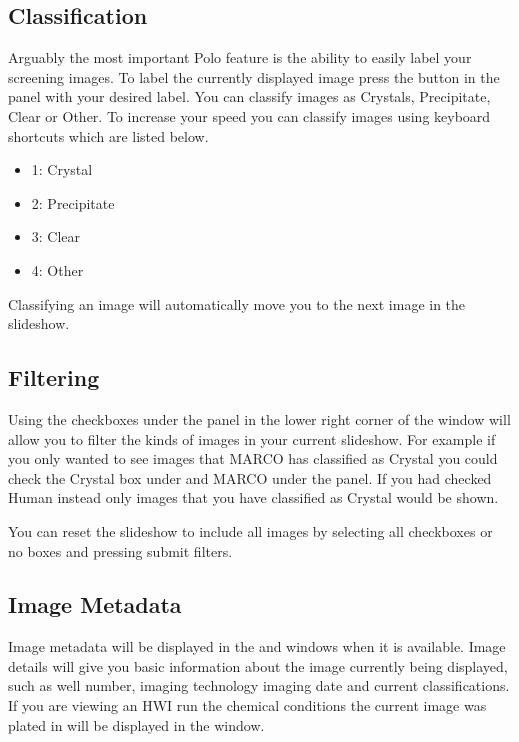 \documentclass[letterpaper,10pt,english]{sphinxmanual}
\begin{document}
\subsection{Classification}
\label{\detokenize{user_guide:classification}}
Arguably the most important Polo feature is the ability to easily
label your screening images. To label the currently displayed image
press the button in the  panel with your desired label.
You can classify images as Crystals, Precipitate, Clear or Other. To increase
your speed you can classify images using keyboard shortcuts which are
listed below.
\begin{itemize}
\item {} 
1: Crystal

\item {} 
2: Precipitate

\item {} 
3: Clear

\item {} 
4: Other

\end{itemize}

Classifying an image will automatically move you to the next image in
the slideshow.


\subsection{Filtering}
\label{\detokenize{user_guide:filtering}}
Using the checkboxes under the  panel in the lower
right corner of the window will allow you to filter the kinds of
images in your current slideshow. For example if you only wanted to
see images that MARCO has classified as Crystal you could check the Crystal box
under  and MARCO under the  panel. If you had checked Human
instead only images that you have classified as Crystal would be shown.

You can reset the slideshow to include all images by selecting all checkboxes
or no boxes and pressing submit filters.


\subsection{Image Metadata}
\label{\detokenize{user_guide:image-metadata}}
Image metadata will be displayed in the  and 
windows when it is available. Image details will give you basic information about
the image currently being displayed, such as well number, imaging technology
imaging date and current classifications. If you are viewing an HWI run
the chemical conditions the current image was plated in will be displayed in the
 window.
\end{document}

